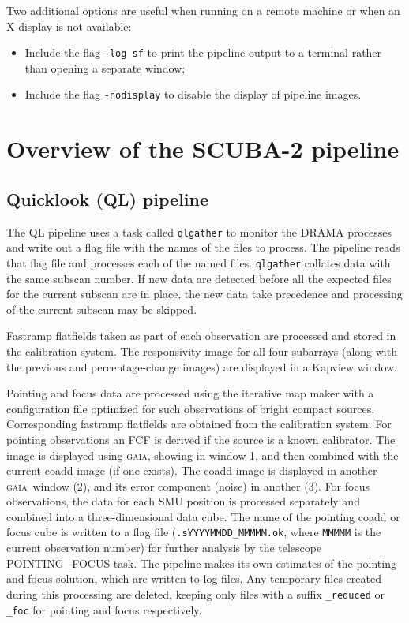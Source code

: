 \documentclass[twoside,11pt,nolof]{starlink}
\providecommand{\GAIA}{\textsc{gaia}}
\begin{document}
Two additional options are useful when running on a remote machine or
when an X display is not available:
\begin{itemize}
\item Include the flag \verb+-log sf+ to print the pipeline output to
  a terminal rather than opening a separate window;
\item Include the flag \verb+-nodisplay+ to disable the display of
  pipeline images.
\end{itemize}

\section{Overview of the SCUBA-2 pipeline\label{se:overview}}

\subsection{Quicklook (QL) pipeline}

The QL pipeline uses a task called \verb+qlgather+ to monitor the
DRAMA processes and write out a flag file with the names of the files
to process. The pipeline reads that flag file and processes each of
the named files. \verb+qlgather+ collates data with the same subscan
number. If new data are detected before all the expected files for
the current subscan are in place, the new data take precedence and
processing of the current subscan may be skipped.

Fastramp flatfields taken as part of each observation are processed
and stored in the calibration system. The responsivity image for all
four subarrays (along with the previous and percentage-change images)
are displayed in a Kapview window.

Pointing and focus data are processed using the iterative map maker
with a configuration file optimized for such observations of bright
compact sources. Corresponding fastramp flatfields are obtained from
the calibration system. For pointing observations an FCF is derived if
the source is a known calibrator. The image is displayed using \GAIA,
showing in window 1, and then combined with the current coadd image
(if one exists). The coadd image is displayed in another \GAIA\ window
(2), and its error component (noise) in another (3). For focus
observations, the data for each SMU position is processed separately
and combined into a three-dimensional data cube. The name of the
pointing coadd or focus cube is written to a flag file
(\verb+.sYYYYMMDD_MMMMM.ok+, where \verb+MMMMM+ is the current
observation number) for further analysis by the telescope
POINTING\_FOCUS task. The pipeline makes its own estimates of the
pointing and focus solution, which are written to log files. Any
temporary files created during this processing are deleted, keeping
only files with a suffix \verb+_reduced+ or \verb+_foc+ for pointing
and focus respectively.
\end{document}
